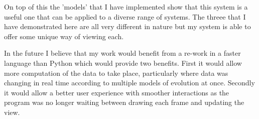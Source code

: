 \documentclass[12pt,a4paper]{article}
\begin{document}
On top of this the 'models' that I have implemented show that this system is a useful one that can be applied to a diverse range of systems. The threee that I have demonstrated here are all very different in nature but my system is able to offer some unique way of viewing each.

In the future I believe that my work would benefit from a re-work in a faster language than Python which would provide two benefits. First it would allow more computation of the data to take place, particularly where data was changing in real time according to multiple models of evolution at once. Secondly it would allow a better user experience with smoother interactions as the program was no longer waiting between drawing each frame and updating the view.


\end{document}

